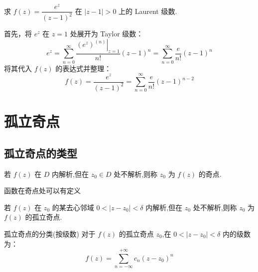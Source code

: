 \documentclass[openany,oneside]{ctexbook}
\begin{document}
\begin{example}
求 \( f(z)=\dfrac{e^z}{(z-1)^2} \) 在 \( |z-1|>0 \) 上的 Laurent 级数.
\end{example}

\begin{solution}
首先，将 \( e^z \) 在 \( z=1 \) 处展开为 Taylor 级数：
\[
e^z = \sum_{n=0}^{\infty} \frac{\left.(e^z)^{(n)}\right|_{z=1}}{n!} (z-1)^n
= \sum_{n=0}^{\infty} \frac{e}{n!} (z-1)^n
\]
将其代入 \( f(z) \) 的表达式并整理：
\[
f(z) = \frac{e^z}{(z-1)^2}
= \sum_{n=0}^{\infty} \frac{e}{n!} (z-1)^{n-2}
\]
\end{solution}
\section{孤立奇点}
\subsection{孤立奇点的类型}
\begin{definition}
  若 $f(z)$ 在 $D$ 内解析,但在 $z_0\in D$ 处不解析,则称 $z_0$ 为 $f(z)$ 的奇点.
\end{definition}
\begin{note}
  函数在奇点处可以有定义
\end{note}
\begin{definition}
  若 $f(z)$ 在 $z_0$ 的某去心邻域 $0 < |z - z_0| < \delta$ 内解析,但在 $z_0$ 处不解析,则称 $z_0$ 为 $f(z)$ 的孤立奇点.
\end{definition}
孤立奇点的分类(按级数)
对于 $f(z)$ 的孤立奇点 $z_0$,在 $0 < |z - z_0| < \delta$ 内的级数为：
\[
f(z) = \sum_{n=-\infty}^{+\infty} c_n(z - z_0)^n
\]
\end{document}

